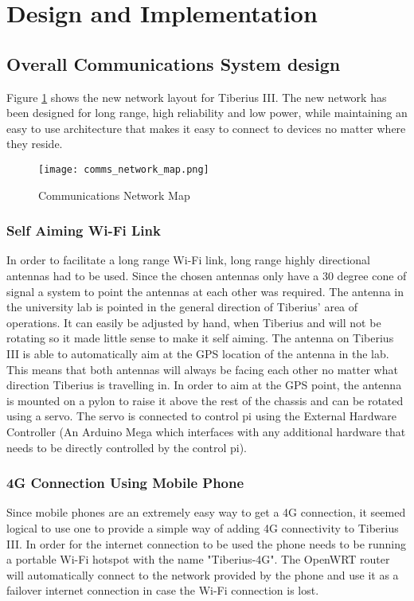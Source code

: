 
\section{Design and Implementation}
\subsection{Overall Communications System design}

Figure \ref{fig:comms_network_map} shows the new network layout for Tiberius III. The new network has been designed for long range, high reliability and low power, while maintaining an easy to use architecture that makes it easy to connect to devices no matter where they reside.

\begin{figure}[!htb]
\begin{center}
\texttt{[image: comms\_network\_map.png]}
\end{center}
\caption{Communications Network Map}
\label{fig:comms_network_map}
\end{figure}

\subsubsection{Self Aiming Wi-Fi Link}
In order to facilitate a long range Wi-Fi link, long range highly directional antennas had to be used. Since the chosen antennas only have a 30 degree cone of signal  a system to point the antennas at each other was required.
\newline
The antenna in the university lab is pointed in the general direction of Tiberius' area of operations. It can easily be adjusted by hand, when Tiberius and will not be rotating so it made little sense to make it self aiming.
\newline
The antenna on Tiberius III is able to automatically aim at the GPS location of the antenna in the lab. This means that both antennas will always be facing each other no matter what direction Tiberius is travelling in. In order to aim at the GPS point, the antenna is mounted on a pylon to raise it above the rest of the chassis and can be rotated using a servo. The servo is connected to control pi using the External Hardware Controller (An Arduino Mega which interfaces with any additional hardware that needs to be directly controlled by the control pi).

\subsubsection{4G Connection Using Mobile Phone}
Since mobile phones are an extremely easy way to get a 4G connection, it seemed logical to use one to provide a simple way of adding 4G connectivity to Tiberius III. In order for the internet connection to be used the phone needs to be running a portable Wi-Fi hotspot with the name "Tiberius-4G". The OpenWRT router will automatically connect to the network provided by the phone and use it as a failover internet connection in case the Wi-Fi connection is lost.

